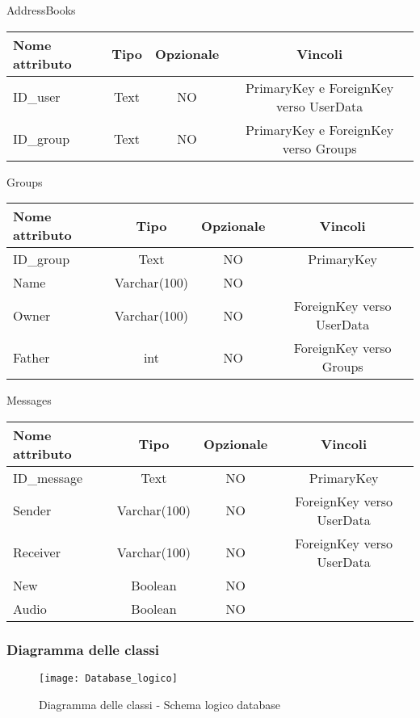 \begin{center}
AddressBooks

\begin{center}
\begin{tabular}{lccc}
\toprule
Nome attributo & Tipo & Opzionale & Vincoli\\
\midrule %
ID\_user & Text & NO & PrimaryKey e ForeignKey verso UserData\\
ID\_group & Text & NO & PrimaryKey e ForeignKey verso Groups\\
\bottomrule
\end{tabular}
\end{center}

Groups

\begin{center}
\begin{tabular}{lccc}
\toprule
Nome attributo & Tipo & Opzionale & Vincoli\\
\midrule %
ID\_group & Text & NO & PrimaryKey\\
Name & Varchar(100) & NO & \\
Owner & Varchar(100) & NO & ForeignKey verso UserData\\
Father & int & NO & ForeignKey verso Groups\\
\bottomrule
\end{tabular}
\end{center}	

Messages

\begin{center}
\begin{tabular}{lccc}
\toprule
Nome attributo & Tipo & Opzionale & Vincoli\\
\midrule %
ID\_message & Text & NO & PrimaryKey\\
Sender & Varchar(100) & NO & ForeignKey verso UserData \\
Receiver & Varchar(100) & NO & ForeignKey verso UserData\\
New & Boolean & NO & \\
Audio & Boolean & NO & \\
\bottomrule
\end{tabular}	
\end{center}

\end{center}

\subsubsection{Diagramma delle classi}
\begin{figure}[H]
\begin{center}
\texttt{[image: Database\_logico]}
\caption{Diagramma delle classi - Schema logico database}\label{fig:database_logico}
\end{center}
\end{figure}

